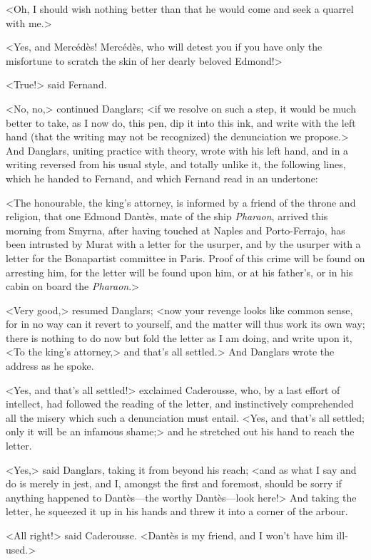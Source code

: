  <Oh, I should wish nothing better than that he would come and seek a quarrel with me.> 

 <Yes, and Mercédès! Mercédès, who will detest you if you have only the misfortune to scratch the skin of her dearly beloved Edmond!> 

 <True!> said Fernand. 

 <No, no,> continued Danglars; <if we resolve on such a step, it would be much better to take, as I now do, this pen, dip it into this ink, and write with the left hand (that the writing may not be recognized) the denunciation we propose.> And Danglars, uniting practice with theory, wrote with his left hand, and in a writing reversed from his usual style, and totally unlike it, the following lines, which he handed to Fernand, and which Fernand read in an undertone: 

 <The honourable, the king's attorney, is informed by a friend of the throne and religion, that one Edmond Dantès, mate of the ship \textit{Pharaon}, arrived this morning from Smyrna, after having touched at Naples and Porto-Ferrajo, has been intrusted by Murat with a letter for the usurper, and by the usurper with a letter for the Bonapartist committee in Paris. Proof of this crime will be found on arresting him, for the letter will be found upon him, or at his father's, or in his cabin on board the \textit{Pharaon}.> 

 <Very good,> resumed Danglars; <now your revenge looks like common sense, for in no way can it revert to yourself, and the matter will thus work its own way; there is nothing to do now but fold the letter as I am doing, and write upon it, <To the king's attorney,> and that's all settled.> And Danglars wrote the address as he spoke. 

 <Yes, and that's all settled!> exclaimed Caderousse, who, by a last effort of intellect, had followed the reading of the letter, and instinctively comprehended all the misery which such a denunciation must entail. <Yes, and that's all settled; only it will be an infamous shame;> and he stretched out his hand to reach the letter. 

 <Yes,> said Danglars, taking it from beyond his reach; <and as what I say and do is merely in jest, and I, amongst the first and foremost, should be sorry if anything happened to Dantès—the worthy Dantès—look here!> And taking the letter, he squeezed it up in his hands and threw it into a corner of the arbour. 

 <All right!> said Caderousse. <Dantès is my friend, and I won't have him ill-used.> 

